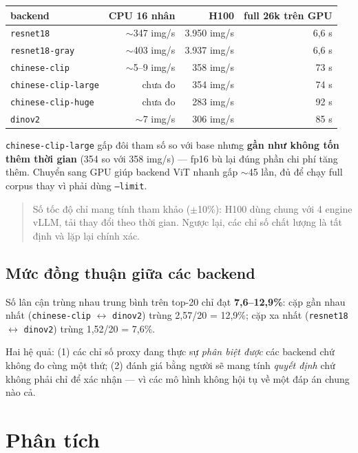 \documentclass[11pt,a4paper]{article}
\newcommand{\code}[1]{\texttt{#1}}
\begin{document}
\begin{table}[h]
\centering
\begin{tabular}{lrrr}
\toprule
backend & CPU 16 nhân & H100 & full 26k trên GPU \\
\midrule
\code{resnet18} & $\sim$347 img/s & 3.950 img/s & 6,6 s \\
\code{resnet18-gray} & $\sim$403 img/s & 3.937 img/s & 6,6 s \\
\code{chinese-clip} & $\sim$5--9 img/s & 358 img/s & 73 s \\
\code{chinese-clip-large} & chưa đo & 354 img/s & 74 s \\
\code{chinese-clip-huge} & chưa đo & 283 img/s & 92 s \\
\code{dinov2} & $\sim$7 img/s & 306 img/s & 85 s \\
\bottomrule
\end{tabular}
\end{table}

\code{chinese-clip-large} gấp đôi tham số so với base nhưng \textbf{gần như không tốn thêm thời
gian} (354 so với 358 img/s) --- fp16 bù lại đúng phần chi phí tăng thêm. Chuyển sang GPU giúp
backend ViT nhanh gấp $\sim$45 lần, đủ để chạy full corpus thay vì phải dùng \code{--limit}.

\begin{quote}
Số tốc độ chỉ mang tính tham khảo ($\pm$10\%): H100 dùng chung với 4 engine vLLM, tải thay đổi
theo thời gian. Ngược lại, các chỉ số chất lượng là tất định và lặp lại chính xác.
\end{quote}

\subsection{Mức đồng thuận giữa các backend}

Số lân cận trùng nhau trung bình trên top-20 chỉ đạt \textbf{7,6--12,9\%}: cặp gần nhau nhất
(\code{chinese-clip} $\leftrightarrow$ \code{dinov2}) trùng 2,57/20 = 12,9\%; cặp xa nhất
(\code{resnet18} $\leftrightarrow$ \code{dinov2}) trùng 1,52/20 = 7,6\%.

Hai hệ quả: (1) các chỉ số proxy đang thực sự \emph{phân biệt được} các backend chứ không đo cùng
một thứ; (2) đánh giá bằng người sẽ mang tính \emph{quyết định} chứ không phải chỉ để xác nhận ---
vì các mô hình không hội tụ về một đáp án chung nào cả.

\section{Phân tích}
\end{document}
